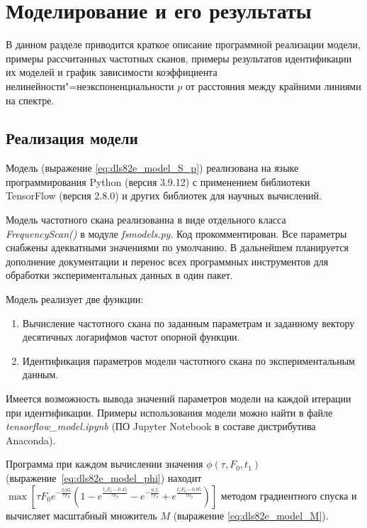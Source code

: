 \section{Моделирование и его результаты}
	В данном разделе приводится краткое описание программной реализации
	модели, примеры рассчитанных частотных сканов, примеры результатов
	идентификации их моделей и график зависимости коэффициента 
	нелинейности"=неэкспоненциальности $p$ от расстояния между крайними
	линиями на спектре.

	\subsection{Реализация модели}
	Модель (выражение \ref{eq:dls82e_model_S_p}) реализована на 
	языке программирования Python (версия 3.9.12) с применением 
	библиотеки TensorFlow (версия 2.8.0) и других библиотек	для научных
	вычислений.

	Модель частотного скана реализованна в виде отдельного класса \\
	\emph{FrequencyScan()} в модуле \emph{fsmodels.py}. Код 
	прокомментирован. Все параметры снабжены адекватными значениями по 
	умолчанию. В дальнейшем планируется дополнение документации и 
	перенос всех программных инструментов для обработки 
	экспериментальных данных в один пакет.

	Модель реализует две функции:
	\begin{enumerate}
		\item Вычисление частотного скана по заданным параметрам и 
		заданному вектору десятичных логарифмов частот опорной функции.
		\item Идентификация параметров модели частотного скана по 
		экспериментальным данным.
	\end{enumerate}
	Имеется возможность вывода значений параметров модели на каждой 
	итерации при идентификации. Примеры использования модели можно найти
	в файле \emph{tensorflow\_model.ipynb} (ПО Jupyter Notebook в составе 
	дистрибутива Anaconda).

	Программа при каждом вычислении значения $\phi\left(\tau,F_0,
	t_1\right)$	(выражение~\ref{eq:dls82e_model_phi}) находит 
	\(
		\max{\left[
	    \tau F_0 e^{-\frac{0.05}{\tau F_0}}
	    \left(1-e^{\frac{t_1 F_0-0.45}{\tau F_0}}
	    -e^{-\frac{0.5}{\tau F_0}}+
	    e^{\frac{t_1 F_0-0.95}{\tau F_0}}\right)
	    \right]}
    \)
	методом	градиентного спуска и вычисляет масштабный множитель $M$ 
	(выражение \ref{eq:dls82e_model_M}).

